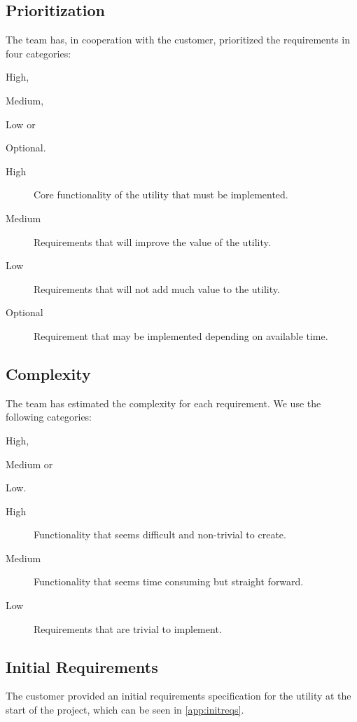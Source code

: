 \subsection{Prioritization}
\label{sec:req:priority}
The team has, in cooperation with the customer, prioritized the requirements
in four categories:
\begin{inparaenum}
	\item High,
	\item Medium,
	\item Low or
	\item Optional.
\end{inparaenum} 

\begin{description}
	\item[High] Core functionality of the \gls{utility} that must be implemented.
	\item[Medium] Requirements that will improve the value of the \gls{utility}.
	\item[Low] Requirements that will not add much value to the \gls{utility}.
	\item[Optional] Requirement that may be implemented depending on available time.
\end{description}

\subsection{Complexity}
\label{sec:req:compl}
The team has estimated the complexity for each requirement. We use the following categories:
\begin{inparaenum}
	\item High,
	\item Medium or
	\item Low.
\end{inparaenum}

\begin{description}
	\item[High] Functionality that seems difficult and non-trivial to create.
	\item[Medium] Functionality that seems time consuming but straight forward.
	\item[Low] Requirements that are trivial to implement.
\end{description}

\subsection{Initial Requirements}
The customer provided an initial requirements specification for the utility at
the start of the project, which can be seen in \autoref{app:initreqs}.

